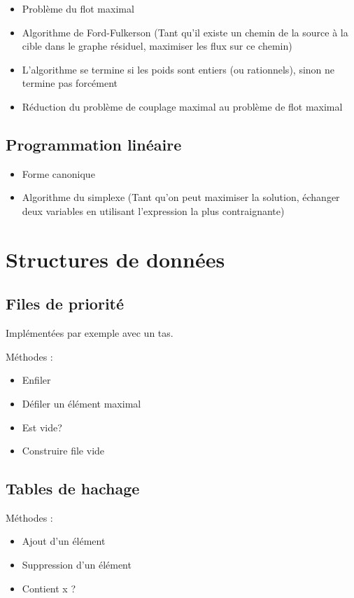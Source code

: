 \documentclass[10pt,a4paper]{article}
\begin{document}
\begin{itemize}[noitemsep]
	\item Problème du flot maximal
	\item Algorithme de Ford-Fulkerson (Tant qu'il existe un chemin de la source à la cible dans le graphe résiduel, maximiser les flux sur ce chemin)
	\item L'algorithme se termine si les poids sont entiers (ou rationnels), sinon ne termine pas forcément
	\item Réduction du problème de couplage maximal au problème de flot maximal
\end{itemize}


\subsection{Programmation linéaire}

\begin{itemize}[noitemsep]
	\item Forme canonique
	\item Algorithme du simplexe (Tant qu'on peut maximiser la solution, échanger deux variables en utilisant l'expression la plus contraignante)
\end{itemize}


\section{Structures de données}

%
\subsection{Files de priorité}

Implémentées par exemple avec un tas.

Méthodes : 
\begin{itemize}[noitemsep]
	\item Enfiler
	\item Défiler un élément maximal
	\item Est vide?
	\item Construire file vide
\end{itemize}

\subsection{Tables de hachage}
	
Méthodes : 
\begin{itemize}[noitemsep]
	\item Ajout d'un élément
	\item Suppression d'un élément
	\item Contient x ?
\end{itemize}
\end{document}
